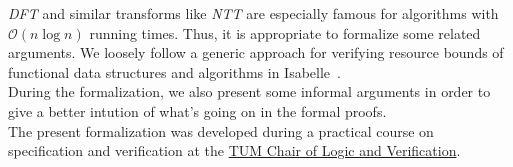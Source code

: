 \documentclass[11pt,a4paper]{article}
\begin{document}
\indent \textit{DFT} and similar transforms like \textit{NTT} are especially famous for algorithms with $\mathcal{O}(n \log n)$ running times. Thus, it is appropriate to formalize some related arguments. We loosely follow a generic approach for verifying resource bounds of functional data structures and algorithms in Isabelle~\parencite{funalgs}.\\
\indent During the formalization, we also present some informal arguments in order to give a better intution of what's going on in the formal proofs.\\
\indent The present formalization was developed during a practical course on specification and verification at the \href{https://www21.in.tum.de/index.html}{TUM Chair of Logic and Verification}.\\


\pagebreak
\printbibliography{}
\end{document}
